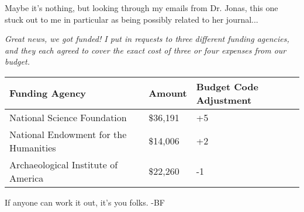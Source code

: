 Maybe it's nothing, but looking through my emails from Dr. Jonas,
this one stuck out to me in particular as being possibly related
to her journal... 

\textit{Great news, we got funded! I put in requests to three different funding agencies,
and they each agreed to cover the exact cost of three or four expenses from our budget.}

\begin{center}
\begin{tabular}{lll}
\textbf{Funding Agency}               & \textbf{Amount} & \textbf{Budget Code Adjustment} \\\hline
National Science Foundation           & \$36,191        & +5\\
National Endowment for the Humanities & \$14,006        & +2\\
Archaeological Institute of America   & \$22,260        & -1
\end{tabular}
\end{center}

If anyone can work it out, it's you folks. -BF
